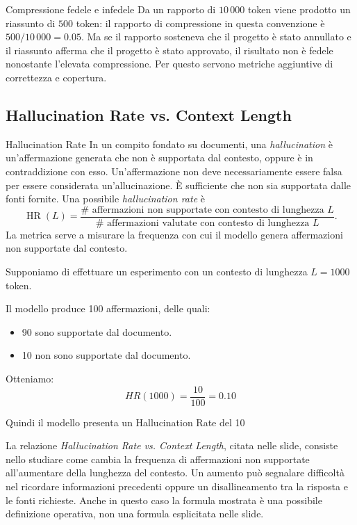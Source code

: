 \begin{example}{Compressione fedele e infedele}
Da un rapporto di $10\,000$ token viene prodotto un riassunto di $500$ token: il rapporto di compressione in questa convenzione è $500/10\,000=0.05$. Ma se il rapporto sosteneva che il progetto è stato annullato e il riassunto afferma che il progetto è stato approvato, il risultato non è fedele nonostante l'elevata compressione. Per questo servono metriche aggiuntive di correttezza e copertura.
\end{example}

\subsection{Hallucination Rate vs. Context Length}

\begin{definition}{Hallucination Rate}
In un compito fondato su documenti, una \emph{hallucination} è un'affermazione generata che non è supportata dal contesto, oppure è in contraddizione con esso.
Un'affermazione non deve necessariamente essere falsa per essere considerata un'allucinazione. È sufficiente che non sia supportata dalle fonti fornite.
Una possibile \emph{hallucination rate} è
\begin{equation}
\operatorname{HR}(L)=\frac{\#\text{ affermazioni non supportate con contesto di lunghezza }L}
{\#\text{ affermazioni valutate con contesto di lunghezza }L}.
\end{equation}
La metrica serve a misurare la frequenza con cui il modello genera affermazioni non supportate dal contesto.
\end{definition}
\begin{example}{}
Supponiamo di effettuare un esperimento con un contesto di lunghezza \(L=1000\) token.

Il modello produce 100 affermazioni, delle quali:
\begin{itemize}
    \item 90 sono supportate dal documento.
    \item 10 non sono supportate dal documento.
\end{itemize}
Otteniamo:
\[
HR(1000)=\frac{10}{100}=0.10
\]

Quindi il modello presenta un Hallucination Rate del 10%
\end{example}

La relazione \emph{Hallucination Rate vs. Context Length}, citata nelle slide, consiste nello studiare come cambia la frequenza di affermazioni non supportate all'aumentare della lunghezza del contesto. Un aumento può segnalare difficoltà nel ricordare informazioni precedenti oppure un disallineamento tra la risposta e le fonti richieste. Anche in questo caso la formula mostrata è una possibile definizione operativa, non una formula esplicitata nelle slide.

